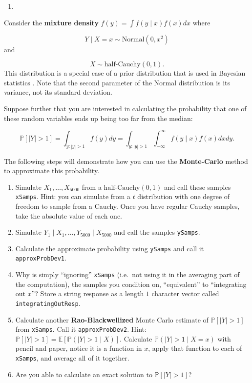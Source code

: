 \documentclass[
  12pt,
  krantz2]{krantz}
\providecommand{\tightlist}{%
  \setlength{\itemsep}{0pt}\setlength{\parskip}{0pt}}
\begin{document}
\begin{enumerate}
\def\labelenumi{\arabic{enumi}.}
\setcounter{enumi}{5}
\tightlist
\item
\end{enumerate}

Consider the \textbf{mixture density} \(f(y) = \int f(y \mid x) f(x) dx\) where

\begin{equation} 
Y \mid X = x \sim \text{Normal}(0, x^2)
\end{equation}
and

\begin{equation} 
X \sim \text{half-Cauchy}(0, 1).
\end{equation}
This distribution is a special case of a prior distribution that is used in Bayesian statistics \citep{horseshoe}. Note that the second parameter of the Normal distribution is its variance, not its standard deviation.

Suppose further that you are interested in calculating the probability that one of these random variables ends up being too far from the median:

\begin{equation} 
\mathbb{P}[|Y| > 1] = \int_{y : |y| > 1} f(y)dy = \int_{y : |y| > 1} \int_{-\infty}^\infty  f(y \mid x) f(x) dx dy.
\end{equation}

The following steps will demonstrate how you can use the \textbf{Monte-Carlo} \citep{monte-carlo-stat-methods} method to approximate this probability.

\begin{enumerate}
\def\labelenumi{\alph{enumi})}
\item
  Simulate \(X_1, \ldots, X_{5000}\) from a \(\text{half-Cauchy}(0, 1)\) and call these samples \texttt{xSamps}. Hint: you can simulate from a \(t\) distribution with one degree of freedom to sample from a Cauchy. Once you have regular Cauchy samples, take the absolute value of each one.
\item
  Simulate \(Y_1 \mid X_1, \ldots, Y_{5000} \mid X_{5000}\) and call the samples \texttt{ySamps}.
\item
  Calculate the approximate probability using \texttt{ySamps} and call it \texttt{approxProbDev1}.
\item
  Why is simply ``ignoring'' \texttt{xSamps} (i.e.~not using it in the averaging part of the computation), the samples you condition on, ``equivalent'' to ``integrating out \(x\)''? Store a string response as a length \(1\) character vector called \texttt{integratingOutResp}.
\item
  Calculate another \textbf{Rao-Blackwellized} Monte Carlo estimate of \(\mathbb{P}[|Y| > 1]\) from \texttt{xSamps}. Call it \texttt{approxProbDev2}. Hint: \(\mathbb{P}[|Y| > 1] = \mathbb{E}[\mathbb{P}(|Y| > 1 \mid X) ]\). Calculate \(\mathbb{P}(|Y| > 1 \mid X=x)\) with pencil and paper, notice it is a function in \(x\), apply that function to each of \texttt{xSamps}, and average all of it together.
\item
  Are you able to calculate an exact solution to \(\mathbb{P}[|Y| > 1]\)?
\end{enumerate}
\end{document}
